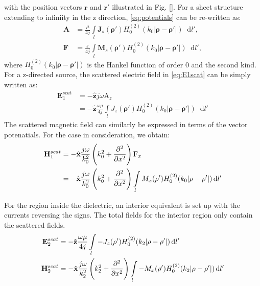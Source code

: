 \documentclass[12pt]{article}
\renewcommand{\v}[1]{\mathbf{#1}} %
\renewcommand{\O}{\omega}  %
\newcommand{\E}{\varepsilon}  %
\renewcommand{\u}{\mu}  %
\newcommand{\p}{\rho}  %
\renewcommand{\^}{\hat}  %
\newcommand*\diff{\mathop{}\!\mathrm{d}} %
\begin{document}
%
with the position vectors $\v r$ and $\v r'$ illustrated in Fig. \ref{}. For a sheet structure extending to infiniity in the z direction, \eqref{eq:potentials} can be re-written as:
%
\begin{subequations}
  \begin{align}
    \v A &=  \frac{\u}{4 j} \int\limits_{l} \v J_s(\v \p') H_0^{(2)}(k_0 |\v \p - \v \p'|) \diff{l'},
    \label{eq:A}\\
    \v F &=  \frac{\E}{4 j} \int\limits_{l} \v M_s(\v \p') H_0^{(2)}(k_0 |\v \p - \v \p'|) \diff{l'},
    \label{eq:Fig}
  \end{align}
  \label{eq:potentials_2d}
\end{subequations}
%
where $H_0^{(2)}(k_0 |\v \p - \v \p'|)$ is the Hankel function of order 0 and the second kind. For a z-directed source, the scattered electric field in \eqref{eq:E1scat} can be simply written as:
%
\begin{equation}
  \begin{split}
    \v E_1^{scat} &= -\hat{\v z} j \O \mathrm A_z \\
    &= -\hat{\v z} \frac{\O \u}{4 j} \int\limits_{l} J_z(\v \p')  H_0^{(2)}(k_0 |\v \p - \v \p'|) \diff{l'}
  \end{split}
  \label{eq:E1sc}
\end{equation}
%
The scattered magnetic field can similarly be expressed in terms of the vector potenatials. For the case in consideration, we obtain:
%
\begin{equation}
  \begin{split}
    \v H_1^{scat} &= -\hat{\v x}  \frac{j \O}{k_0^2}\left(k_0^2 +  \pdv[2]{}{x} \right) \mathrm F_x \\
    &= -\hat{\v x}  \frac{j \O}{k_0^2}\left(k_0^2 +  \pdv[2]{}{x} \right) \int\limits_{l} M_x(\v \p') H_0^{(2)}(k_0 |\v \p - \v \p'|) \diff{l'}
  \end{split}
  \label{eq:H1sc}
\end{equation}

For the region inside the dielectric, an interior equivalent is set up with the currents reversing the signs. The total fields for the interior region only contain the scattered fields.
%
\begin{subequations}
  \begin{align}
    \v E_2^{scat} &= -\hat{\v z} \frac{\O \u}{4 j} \int\limits_{l} -J_z(\v \p')  H_0^{(2)}(k_2 |\v \p - \v \p'|) \diff{l'}
    \label{eq:E2sc}\\
    \v H_2^{scat} &= -\hat{\v x}  \frac{j \O}{k_2^2}\left(k_2^2 +  \pdv[2]{}{x} \right) \int\limits_{l} -M_x(\v \p') H_0^{(2)}(k_2 |\v \p - \v \p'|) \diff{l'}
    \label{eq:H2sc}
  \end{align}
  \label{eq:2sc}
\end{subequations}
\end{document}
